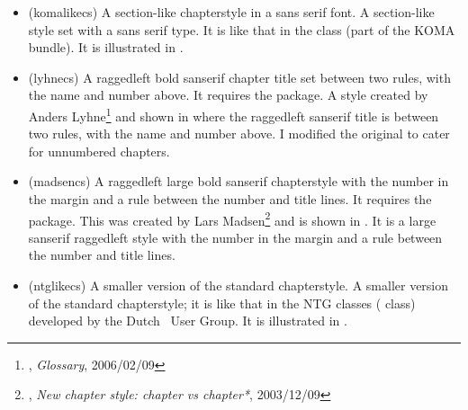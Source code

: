 \begin{itemize}
\item[\cstyle{komalike}] 
\glossary(komalikecs)%
  {}%
  { A section-like chapterstyle in a sans serif font.}
A section-like style set with a sans serif type. It is like that in the
 class (part of the KOMA bundle). 
It is illustrated in 
.



\item[\cstyle{lyhne}] 
\glossary(lyhnecs)%
  {}%
  {A raggedleft bold sanserif chapter title set between two rules, with the
   name and number above. It requires the  package.}
  A style created by Anders
  Lyhne\footnote{\ctt, \textit{Glossary}, 2006/02/09} and shown in 
  where the raggedleft
  sanserif title is between two rules, with the name and number above.
  I modified the original to cater for unnumbered chapters. 



\item[\cstyle{madsen}] 
\glossary(madsencs)%
  {}%
  {A raggedleft large bold sanserif chapterstyle with the number in the
   margin and a rule between the number and title lines.
   It requires the  package.}
  This was created by 
  Lars Madsen\footnote{\ctt,
  \textit{New chapter style: chapter vs chapter*}, 2003/12/09}
  and is shown in .
  It is a large sanserif raggedleft style with the number in the margin
  and a rule between the number and title lines. 



\item[\cstyle{ntglike}] 
\glossary(ntglikecs)%
  {}%
  { A smaller version of the standard chapterstyle.}
A smaller version of the standard chapterstyle; it is like that in the NTG 
classes ( class) developed by the Dutch \tx\ User Group.
It is illustrated in 
.


\end{itemize}
